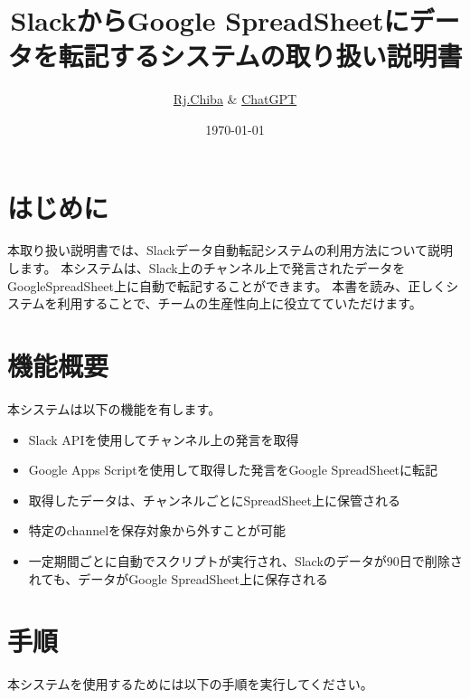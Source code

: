 \documentclass[a4j, 11pt, dvipdfmx]{jsarticle}
\begin{document}
\title{SlackからGoogle SpreadSheetにデータを転記するシステムの取り扱い説明書}
\author{ \href{https://www.twitter.com/rj\_phys}{Rj.Chiba} \& \href{https://openai.com/blog/chatgpt}{ChatGPT} }
\date{\today}
\maketitle

\section{はじめに}
本取り扱い説明書では、Slackデータ自動転記システムの利用方法について説明します。
本システムは、Slack上のチャンネル上で発言されたデータをGoogleSpreadSheet上に自動で転記することができます。
本書を読み、正しくシステムを利用することで、チームの生産性向上に役立てていただけます。

\section{機能概要}
本システムは以下の機能を有します。

\begin{itemize}
\item Slack APIを使用してチャンネル上の発言を取得
\item Google Apps Scriptを使用して取得した発言をGoogle SpreadSheetに転記
\item 取得したデータは、チャンネルごとにSpreadSheet上に保管される
\item 特定のchannelを保存対象から外すことが可能
\item 一定期間ごとに自動でスクリプトが実行され、Slackのデータが90日で削除されても、データがGoogle SpreadSheet上に保存される
\end{itemize}

\section{手順}
本システムを使用するためには以下の手順を実行してください。
\end{document}
